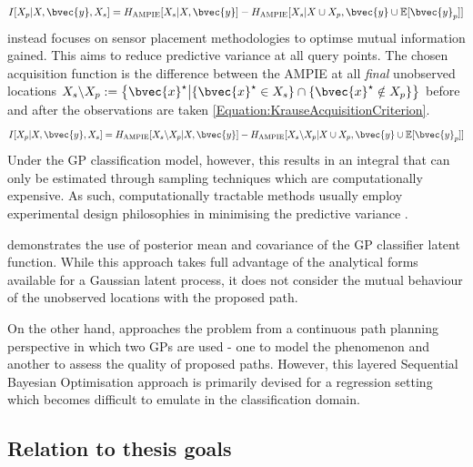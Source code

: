 \begin{equation}
				I[X_{p} | X, \bvec{y}, X_{s}] = H_{\mathrm{AMPIE}}[X_{s} | X, \bvec{y}] - H_{\mathrm{AMPIE}}[X_{s} | X \cup X_{p}, \bvec{y} \cup \mathbb{E}[\bvec{y}_{p}]]
			\label{Equation:AsherBenderAcquisitionCriterion}
			\end{equation} \cite{Krause:2008:NSP:1390681.1390689} instead focuses on sensor placement methodologies to optimse mutual information gained. This aims to reduce predictive variance at all query points. The chosen acquisition function is the difference between the AMPIE at all \textit{final} unobserved locations $X_{s} \backslash X_{p} := \big\{\bvec{x}^{\star} \big| \{\bvec{x}^{\star} \in X_{s}\} \cap \{\bvec{x}^{\star} \notin X_{p}\} \big\}$ before and after the observations are taken \eqref{Equation:KrauseAcquisitionCriterion}. \begin{equation}
				I[X_{p} | X, \bvec{y}, X_{s}] = H_{\mathrm{AMPIE}}[X_{s} \backslash X_{p} | X, \bvec{y}] - H_{\mathrm{AMPIE}}[X_{s} \backslash X_{p} | X \cup X_{p}, \bvec{y} \cup \mathbb{E}[\bvec{y}_{p}]]
			\label{Equation:KrauseAcquisitionCriterion}
			\end{equation} Under the GP classification model, however, this results in an integral that can only be estimated through sampling techniques which are computationally expensive. As such, computationally tractable methods usually employ experimental design philosophies in minimising the predictive variance \citep{AsherBender}.
			
			\cite{Kapoor} demonstrates the use of posterior mean and covariance of the GP classifier latent function. While this approach takes full advantage of the analytical forms available for a Gaussian latent process, it does not consider the mutual behaviour of the unobserved locations with the proposed path.
			
			On the other hand, \cite{Roman:SequentialBayesianOptimisation} approaches the problem from a continuous path planning perspective in which two GPs are used - one to model the phenomenon and another to assess the quality of proposed paths. However, this layered Sequential Bayesian Optimisation approach is primarily devised for a regression setting which becomes difficult to emulate in the classification domain.

		\subsection{Relation to thesis goals}
		\label{Background:RelatedWork:ThesisGoals}
		
